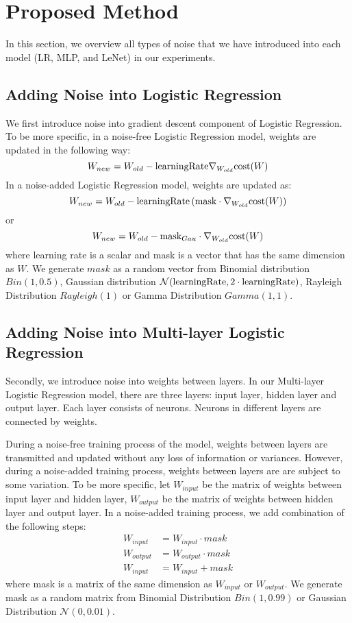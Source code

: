 \section{Proposed Method}
\label{sec:method}

In this section, we overview all types of noise that we have introduced into
each model (LR, MLP, and LeNet) in our experiments.

\subsection{Adding Noise into Logistic Regression}
We first introduce noise into gradient descent component
of Logistic Regression.
To be more specific, in a noise-free Logistic Regression model, weights
are updated in the following way:
\[
W_{new} = W_{old} - \text{learningRate} \nabla_{W_{old}} \text{cost}(W)
\]
In a noise-added Logistic Regression model, weights are updated as:
\[
W_{new}=W_{old}-\text{learningRate} \left(\text{mask} \cdot \nabla_{W_{old}}\text{cost}(W) \right)
\]
or
\[
W_{new} = W_{old} - \text{mask}_{Gau} \cdot \nabla_{W_{old}} \text{cost}(W)
\]
where learning rate is a scalar and mask is a vector that has the same dimension as $W$.
We generate $mask$ as a random vector from Binomial distribution
$Bin(1,0.5)$, Gaussian distribution $\mathcal{N}(\text{learningRate}, 2 \cdot \text{learningRate})$,
Rayleigh Distribution $Rayleigh(1)$ or Gamma Distribution $Gamma(1,1)$.

\subsection{Adding Noise into Multi-layer Logistic Regression}
Secondly, we introduce noise into weights between layers.
In our Multi-layer Logistic Regression model, there are three layers:
input layer, hidden layer and output layer. Each layer consists of
neurons. Neurons in different layers are connected by weights.

During a noise-free training process of the model, weights between layers
are transmitted and updated without any loss of information or variances.
However, during a noise-added training process, weights between layers are
are subject to some variation.
To be more specific, let $W_{input}$ be the matrix of weights between
input layer and hidden layer, $W_{output}$ be the matrix of weights
between hidden layer and output layer. In a noise-added training process,
we add combination of the following steps:
\begin{align*}
W_{input} & = W_{input} \cdot mask \\
W_{output} & = W_{output} \cdot mask \\
W_{input} & = W_{input} + mask
\end{align*}
where mask is a matrix of the same dimension as $W_{input}$ or $W_{output}$.
We generate mask as a random matrix from Binomial Distribution
$Bin(1,0.99)$ or Gaussian Distribution $\mathcal{N}(0, 0.01)$.

